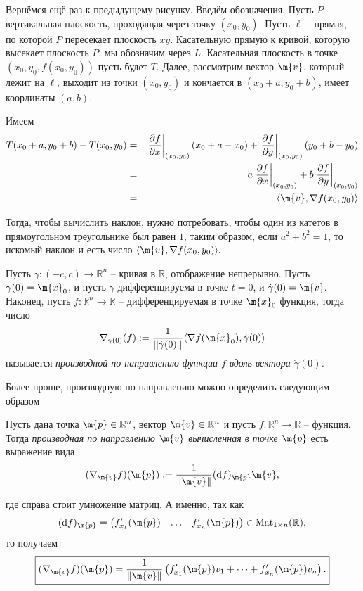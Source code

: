 Вернёмся ещё раз к предыдущему рисунку. Введём обозначения. Пусть $P$ -- вертикальная плоскость, проходящая через точку $(x_0,y_0)$. Пусть $\ell$ -- прямая, по которой $P$ пересекает плоскость $xy$. Касательную прямую к кривой, которую высекает плоскость $P$, мы обозначим через $L$. Касательная плоскость в точке $(x_0,y_0, f(x_0,y_0))$ пусть будет $T$. Далее, рассмотрим вектор $\m{v}$, который лежит на $\ell$, выходит из точки $(x_0,y_0)$ и кончается в $(x_0+a, y_0 +b)$, \ie имеет координаты $(a,b)$.

Имеем
\begin{eqnarray*}
    T(x_0 + a, y_0 + b) - T(x_0,y_0) &=& \left.\frac{\partial f}{\partial x}\right|_{(x_0,y_0)} (x_0 +a-x_0) + \left.\frac{\partial f}{\partial y}\right|_{(x_0,y_0)} (y_0 +b-y_0) \\
    &=& a\left.\frac{\partial f}{\partial x}\right|_{(x_0,y_0)} + b\left.\frac{\partial f}{\partial y}\right|_{(x_0,y_0)} \\
    &=& \langle \m{v} , \nabla f (x_0, y_0) \rangle
\end{eqnarray*}

Тогда, чтобы вычислить наклон, нужно потребовать, чтобы один из катетов в прямоугольном треугольнике был равен $1$, таким образом, если $a^2 + b^2 = 1$, то искомый наклон и есть число $\langle \m{v} , \nabla f (x_0, y_0) \rangle.$

\begin{definition}
    Пусть $\gamma: (-c,c) \to \mathbb{R}^n$ -- кривая в $\mathbb{R}$, \ie отображение непрерывно. Пусть $\gamma(0) = \m{x}_0$, и пусть $\gamma$ дифференцируема в точке $t = 0$, и $\dot\gamma(0) = \m{v}.$ Наконец, пусть $f:\mathbb{R}^n \to \mathbb{R}$ -- дифференцируемая в точке $\m{x}_0$ функция, тогда число 
    \[
     \nabla_{\dot\gamma(0)}(f):= \dfrac{1}{||\dot\gamma(0)||}\langle \nabla f(\m{x}_0), \dot\gamma(0) \rangle
    \]
    называется \textit{производной по направлению функции $f$ вдоль вектора $\dot \gamma(0)$.}
\end{definition}


Более проще, производную по направлению можно определить следующим образом
\begin{definition}
    Пусть дана точка $\m{p} \in \mathbb{R}^n$, вектор $\m{v}\in \mathbb{R}^n$ и пусть $f:\mathbb{R}^n \to \mathbb{R}$ -- функция. Тогда \textit{производная по направлению $\m{v}$ вычисленная в точке $\m{p}$} есть выражение вида
    \[
     (\nabla_\m{v}f)(\m{p}): = \frac{1}{\| \m{v}\|} (\mathrm{d}f)_\m{p} \m{v},
    \]
\end{definition}
где справа стоит умножение матриц. А именно, так как
\[
 (\mathrm{d}f)_\m{p} = \begin{pmatrix}
     f'_{x_1}(\m{p}) & \ldots & f'_{x_n}(\m{p})
 \end{pmatrix} \in \mathrm{Mat}_{1\times n}(\mathbb{R}),
\]
то получаем
\[
 \boxed{
 (\nabla_\m{v}f)(\m{p}) =\frac{1}{\|\m{v}\|} \left(  f'_{x_1}(\m{p})v_1 + \cdots + f'_{x_n}(\m{p}) v_n\right).
 }
\]



